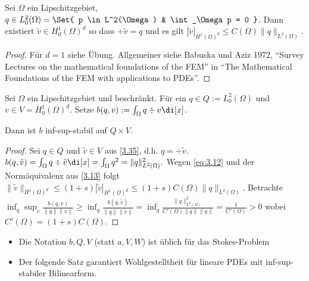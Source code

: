 \begin{st} \label{3.35}
	Sei $\Omega$ ein Lipschitzgebiet, $q \in L_0^2(\Omega) = \Set{ p \in L^2(\Omega) & \int_\Omega p = 0 }$.
	Dann existiert $\tilde v \in H_0^1(\Omega)^d$ so dass $\div \tilde v = q$ und es gilt
	\begin{math}[numbered] \label{eq:3.12}
		|\tilde v|_{H^1(\Omega)^d}
		\le C(\Omega) \|q\|_{L^2(\Omega)}.
	\end{math}
	\begin{proof}
		Für $d = 1$ siehe Übung.
		Allgemeiner siehe Babuska und Aziz 1972, “Survey Lectures on the mathematical foundations of the FEM” in “The Mathematical Foundations of the FEM with applications to PDEs”.
	\end{proof}
\end{st}

\begin{kor} \label{3.36}
	Sei $\Omega$ ein Lipschitzgebiet und beschränkt.
	Für ein $q \in Q := L_0^2(\Omega)$ und $v \in V = H_0^1(\Omega)^d$.
	Setze $b(q,v) := \int_\Omega q \div v \di[x]$.

	Dann ist $b$ inf-sup-stabil auf $Q \times V$.
	\begin{proof}
		Sei $q \in Q$ und $\tilde v \in V$ aus \ref{3.35}, d.h. $q = \div \tilde v$.
		\begin{math}
			b(q,\tilde v)
			= \int_\Omega q \div \tilde v \di[x]
			= \int_\Omega q^2
			= \|q\|^2_{L^2(\Omega)}.
		\end{math}
		Wegen \eqref{eq:3.12} und der Normäquivalenz aus \ref{3.13} folgt
		\begin{math}
			\|\tilde v\|_{H^1(\Omega)^d}
			\le (1+s) |\tilde v|_{H^1(\Omega)^d}
			\le (1+s) C(\Omega) \|q\|_{L^2(\Omega)}.
		\end{math}
		Betrachte
		\begin{math}
			\inf_{q} \sup_{v} \frac{b(q,v)}{\|q\|\|v\|}
			\ge \inf_{q} \frac{b(q,\tilde v)}{\|q\|\|\tilde v\|}
			= \inf_{q} \frac{\|q\|_{L^2(\Omega)}^2}{C'(\Omega) \|q\|\|q\|}
			= \frac{1}{C'(\Omega)}
			> 0
		\end{math}
		wobei $C'(\Omega) = (1 + s) C(\Omega)$.
	\end{proof}
\end{kor}

\begin{note}
	\begin{itemize}
		\item
			Die Notation $b, Q, V$ (statt $a, V, W$) ist üblich für das Stokes-Problem
		\item
			Der folgende Satz garantiert Wohlgestelltheit für lineare PDEs mit inf-sup-stabiler Bilinearform.
	\end{itemize}
\end{note}

